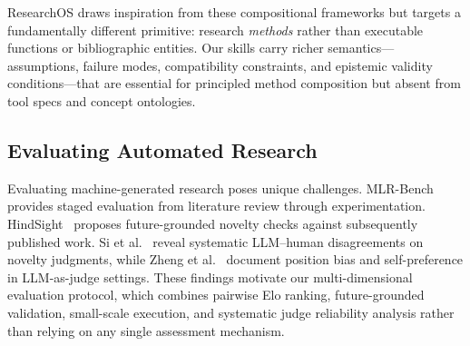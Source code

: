 ResearchOS draws inspiration from these compositional frameworks but targets a fundamentally different primitive: research \emph{methods} rather than executable functions or bibliographic entities. Our skills carry richer semantics---assumptions, failure modes, compatibility constraints, and epistemic validity conditions---that are essential for principled method composition but absent from tool specs and concept ontologies.

\subsection{Evaluating Automated Research}
\label{sec:rw_eval}

Evaluating machine-generated research poses unique challenges. MLR-Bench~\cite{huang2024mlrbench} provides staged evaluation from literature review through experimentation. HindSight~\cite{du2024hindisight} proposes future-grounded novelty checks against subsequently published work. Si et al.~\cite{si2024llmideas} reveal systematic LLM--human disagreements on novelty judgments, while Zheng et al.~\cite{zheng2024judging} document position bias and self-preference in LLM-as-judge settings. These findings motivate our multi-dimensional evaluation protocol, which combines pairwise Elo ranking, future-grounded validation, small-scale execution, and systematic judge reliability analysis rather than relying on any single assessment mechanism.

